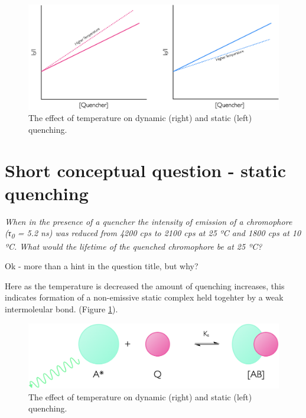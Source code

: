 \documentclass[
]{book}
\begin{document}
\begin{figure}

{\centering \includegraphics[width=1\linewidth]{images/quenchintensityconc} 

}

\caption{The effect of temperature on dynamic (right) and static (left) quenching.}\label{fig:quenchingtemp}
\end{figure}

\hypertarget{sec:static}{%
\section{Short conceptual question - static quenching}\label{sec:static}}

\emph{When in the presence of a quencher the intensity of emission of a chromophore (τ\textsubscript{0} = 5.2 ns) was reduced from 4200 cps to 2100 cps at 25 ºC and 1800 cps at 10 ºC. What would the lifetime of the quenched chromophore be at 25 ºC?}

Ok - more than a hint in the question title, but why?

Here as the temperature is decreased the amount of quenching increases, this indicates formation of a non-emissive static complex held togehter by a weak intermoleular bond. (Figure \ref{fig:quenchingtemp}).

\begin{figure}

{\centering \includegraphics[width=1\linewidth]{images/staticquenching} 

}

\caption{The effect of temperature on dynamic (right) and static (left) quenching.}\label{fig:staticquench}
\end{figure}
\end{document}
